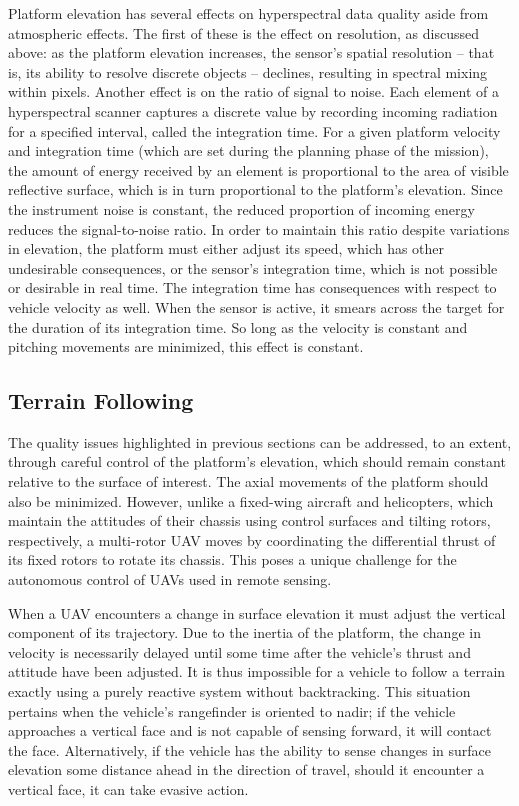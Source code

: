 \documentclass[10pt]{article}
\begin{document}
Platform elevation has several effects on hyperspectral data quality aside from atmospheric effects. The first of these is the effect on resolution, as discussed above: as the platform elevation increases, the sensor's spatial resolution -- that is, its ability to resolve discrete objects -- declines, resulting in spectral mixing within pixels. Another effect is on the ratio of signal to noise. Each element of a hyperspectral scanner captures a discrete value by recording incoming radiation for a specified interval, called the integration time. For a given platform velocity and integration time (which are set during the planning phase of the mission), the amount of energy received by an element is proportional to the area of visible reflective surface, which is in turn proportional to the platform's elevation. Since the instrument noise is constant, the reduced proportion of incoming energy reduces the signal-to-noise ratio. In order to maintain this ratio despite variations in elevation, the platform must either adjust its speed, which has other undesirable consequences, or the sensor's integration time, which is not possible or desirable in real time. The integration time has consequences with respect to vehicle velocity as well. When the sensor is active, it smears across the target for the duration of its integration time. So long as the velocity is constant and pitching movements are minimized, this effect is constant.

\subsection{Terrain Following}

The quality issues highlighted in previous sections can be addressed, to an extent, through careful control of the platform's elevation, which should remain constant relative to the surface of interest. The axial movements of the platform should also be minimized. However, unlike a fixed-wing aircraft and helicopters, which maintain the attitudes of their chassis using control surfaces and tilting rotors, respectively, a multi-rotor UAV moves by coordinating the differential thrust of its fixed rotors to rotate its chassis. This poses a unique challenge for the autonomous control of UAVs used in remote sensing.

When a UAV encounters a change in surface elevation it must adjust the vertical component of its trajectory. Due to the inertia of the platform, the change in velocity is necessarily delayed until some time after the vehicle's thrust and attitude have been adjusted. It is thus impossible for a vehicle to follow a terrain exactly using a purely reactive system without backtracking. This situation pertains when the vehicle's rangefinder is oriented to nadir; if the vehicle approaches a vertical face and is not capable of sensing forward, it will contact the face.  Alternatively, if the vehicle has the ability to sense changes in surface elevation some distance ahead in the direction of travel, should it encounter a vertical face, it can take evasive action.
\end{document}
